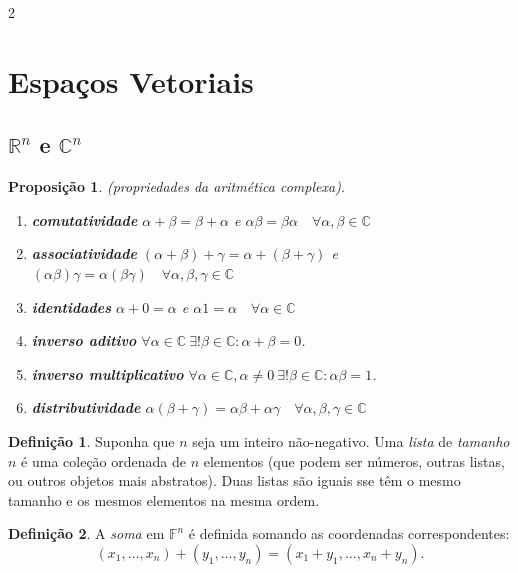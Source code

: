 \documentclass{article}
\theoremstyle{plain}
\newtheorem{prop}[thm]{Proposição}
\theoremstyle{definition}
\newtheorem{defn}{Definição}[section]
\theoremstyle{remark}
\begin{document}
\begin{multicols}{2}

\section{Espaços Vetoriais}

\subsection{\(\mathbb{R}^n\) e \(\mathbb{C}^n\)}
\begin{prop} (propriedades da aritmética complexa).
    \begin{enumerate}
        \item[\textup{(a)}] \textup{\textbf{comutatividade}} \(\alpha + \beta = \beta + \alpha\) e \(\alpha \beta = \beta \alpha \quad \forall \alpha, \beta \in \mathbb{C}\)
        \item[\textup{(b)}] \textup{\textbf{associatividade}} \((\alpha + \beta) + \gamma = \alpha + (\beta + \gamma)\) e \((\alpha \beta) \gamma = \alpha (\beta \gamma) \quad \forall \alpha, \beta, \gamma \in \mathbb{C}\)
        \item[\textup{(c)}] \textup{\textbf{identidades}} \(\alpha + 0 = \alpha\) e \(\alpha 1 = \alpha \quad \forall \alpha \in \mathbb{C}\)
        \item[\textup{(d)}] \textup{\textbf{inverso aditivo}} \(\forall \alpha \in \mathbb{C}\ \exists!\beta \in \mathbb{C}: \alpha + \beta = 0\).
        \item[\textup{(e)}] \textup{\textbf{inverso multiplicativo}} \(\forall \alpha \in \mathbb{C}, \alpha \neq 0\ \exists! \beta \in \mathbb{C}: \alpha \beta = 1\).
        \item[\textup{(f)}] \textup{\textbf{distributividade}} \(\alpha(\beta + \gamma) = \alpha \beta + \alpha \gamma \quad \forall \alpha, \beta, \gamma \in \mathbb{C}\)
    \end{enumerate}
\end{prop}

\begin{defn}
    Suponha que \(n\) seja um inteiro não-negativo. Uma \emph{lista} de \emph{tamanho} \(n\) é uma coleção ordenada de \(n\) elementos (que podem ser números, outras listas, ou outros objetos mais abstratos). Duas listas são iguais sse têm o mesmo tamanho e os mesmos elementos na mesma ordem.
\end{defn}

\begin{defn}
    A \emph{soma} em \(\mathbb{F}^n\) é definida somando as coordenadas correspondentes:
    \[
        (x_1, \ldots, x_n) + (y_1, \ldots, y_n) = (x_1 + y_1, \ldots, x_n + y_n).
    \]
\end{defn}


\end{multicols}
\end{document}
